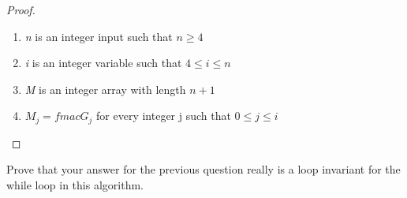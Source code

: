 \documentclass[12pt]{article}
\newenvironment{problem}[2][Problem]{\begin{trivlist}
\item[\hskip \labelsep {\bfseries #1}\hskip \labelsep {\bfseries #2.}]}{\end{trivlist}}
\begin{document}
\begin{proof}
\begin{enumerate}
        \item \textit{n} is an integer input such that $n \geq 4$
        \item \textit{i} is an integer variable such that $4 \leq i \leq n$
        \item \textit{M} is an integer array with length $n+1$
        \item $M_{j} = fmacG_{j}$ for every integer j such that $ 0 \leq j \leq i$
   \end{enumerate}
\end{proof}



\begin{problem}{7}
Prove that your answer for the previous question really is a loop invariant for the while
loop in this algorithm.
\end{problem}
\end{document}
